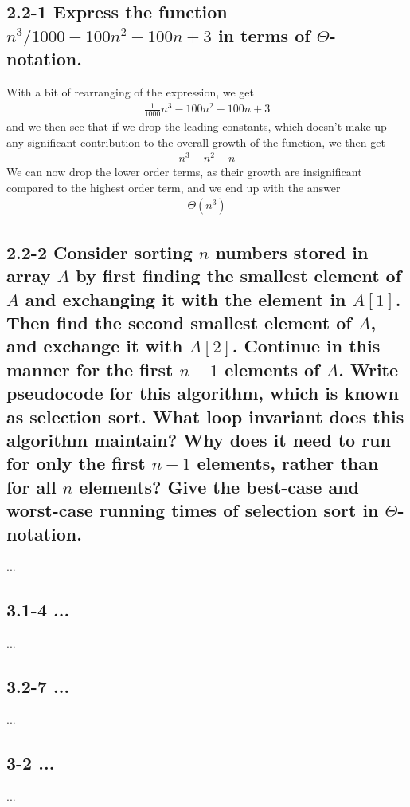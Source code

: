 \documentclass[11pt,english]{article}
\begin{document}
\subsection*{2.2-1 \mdseries Express the function
$n^3/1000 - 100n^2 - 100n + 3$ in terms of $\Theta$-notation.}
With a bit of rearranging of the expression, we get
\begin{align}
	\frac{1}{1000} n^3 - 100n^2 - 100n + 3
\end{align}
and we then see that if we drop the leading constants, which doesn't make up
any significant contribution to the overall growth of the function, we then
get
\begin{align}
	n^3 - n^2 - n
\end{align}
We can now drop the lower order terms, as their growth are insignificant
compared to the highest order term, and we end up with the answer
\begin{align}
	\Theta(n^3)
\end{align}

\subsection*{2.2-2 \mdseries Consider sorting $n$ numbers stored in array $A$
by first finding the smallest element of $A$ and exchanging it with the
element in $A[1]$. Then find the second smallest element of $A$, and exchange
it with $A[2]$. Continue in this manner for the first $n-1$ elements of $A$.
Write pseudocode for this algorithm, which is known as
\textbf{selection sort}. What loop invariant does this algorithm maintain?
Why does it need to run for only the first $n-1$ elements, rather than for all
$n$ elements? Give the best-case and worst-case running times of selection
sort in $\Theta$-notation.}
...


\subsection*{3.1-4 \mdseries ...}
...

\subsection*{3.2-7 \mdseries ...}
...

\subsection*{3-2 \mdseries ...}
...
\end{document}
